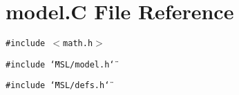 \section{model.C File Reference}
\label{model_8C}
{\tt \#include $<$math.h$>$}\par
{\tt \#include \char`\"{}MSL/model.h\char`\"{}}\par
{\tt \#include \char`\"{}MSL/defs.h\char`\"{}}\par
